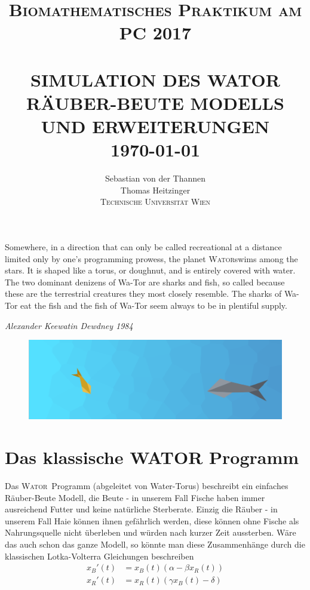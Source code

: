\documentclass[a4paper,11pt]{article}
\title{ \normalsize \textsc{Biomathematisches Praktikum am PC 2017}    %
            \\[3.0cm]                   %
            \HRule{1pt} \\ [0.5cm]      %
            \LARGE \textbf{\uppercase{Simulation des WATOR Räuber-Beute Modells und Erweiterungen}}    %
            \HRule{1pt} \\ [0.5cm]      %
            \normalsize \today          %
        }
\author{
	        Sebastian von der Thannen\\
	        Thomas Heitzinger\\
	        \vspace{10mm}
	        \textsc{Technische Universität Wien}\\
	}
\makeatletter
\newcommand{\wator}{\textsc{Wator}}
\theoremstyle{definition}
\numberwithin{equation}{section}
\def\printtitle{%
    {\centering \@title\par}}
\def\printauthor{%
    {\centering \large \@author}}
\makeatother
\begin{document}
	\thispagestyle{empty}       %

	\printtitle                 %
	\vfill
	\printauthor                %
	\newpage
	
	
	\epigraph{
		Somewhere, in a direction that can only be called recreational at a distance limited only by one's programming prowess, the planet \wator swims among the stars. It is shaped like a torus, or doughnut, and is entirely covered with water. The two dominant denizens of Wa-Tor are sharks and fish, so called because these are the terrestrial creatures they most closely resemble. The sharks of Wa-Tor eat the fish and the fish of Wa-Tor seem always to be in plentiful supply.
	}{\textit{Alexander Keewatin Dewdney 1984}}

	\begin{figure}[H]
		\centering
		\includegraphics[width=1\textwidth]{pictures/encounter.png}
		\label{fig:encounter}
	\end{figure}

	\section{Das klassische WATOR Programm}

	Das \wator\ Programm (abgeleitet von Water-Torus) beschreibt ein einfaches Räuber-Beute Modell, die Beute - in unserem Fall Fische haben immer ausreichend Futter und keine natürliche Sterberate. Einzig die Räuber - in unserem Fall Haie können ihnen gefährlich werden, diese können ohne Fische als Nahrungsquelle nicht überleben und würden nach kurzer Zeit aussterben. Wäre das auch schon das ganze Modell, so könnte man diese Zusammenhänge durch die klassischen Lotka-Volterra Gleichungen beschreiben
	\begin{align} \label{eq:lotka_volterra}
		x_B'(t) &= x_B(t) \left(\alpha - \beta x_R(t)\right) \\
		x_R'(t) &= x_R(t) \left(\gamma x_B(t) - \delta\right) \nonumber
	\end{align}
\end{document}
